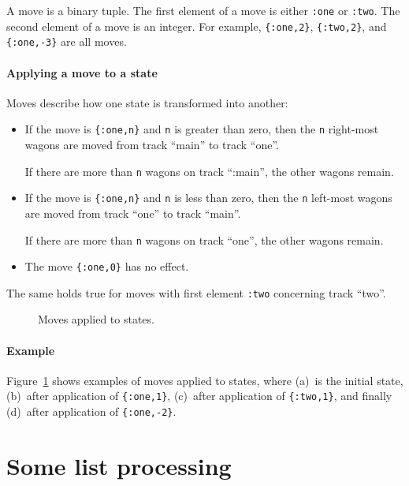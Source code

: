 \documentclass[a4paper,11pt]{article}
\begin{document}
A move is a binary tuple. The first element of a move is either
\verb+:one+ or \verb+:two+. The second element of a move is an
integer. For example, \verb+{:one,2}+, \verb+{:two,2}+, and
\verb+{:one,-3}+ are all moves.

\paragraph{Applying a move to a state}

Moves describe how one state is transformed into another:
\begin{itemize}
\item If the move is \verb+{:one,n}+ and \verb+n+ is greater than
  zero, then the \verb+n+ right-most wagons are moved from track
  ``main'' to track ``one''.

  If there are more than \verb+n+ wagons on track ``:main'', the
  other wagons remain.

\item If the move is \verb+{:one,n}+ and \verb+n+ is less than zero,
  then the \verb+n+ left-most wagons are moved from track ``one''
  to track ``main''.

  If there are more than \verb+n+ wagons on track ``one'', the
  other wagons remain.
\item The move \verb+{:one,0}+ has no effect.
\end{itemize}

The same holds true for moves with first element \verb+:two+
concerning track ``two''.

\begin{figure}[h]
\begin{center}
\end{center}
\caption{Moves applied to states.}
\label{fig:ex-moves}
\end{figure}

\paragraph{Example}

Figure~\ref{fig:ex-moves} shows examples of moves applied to
states, where (a)~is the initial state, (b)~after application of
\verb+{:one,1}+, (c)~after application of \verb+{:two,1}+, and finally
(d)~after application of \verb+{:one,-2}+.

\section{Some list processing}
\end{document}
